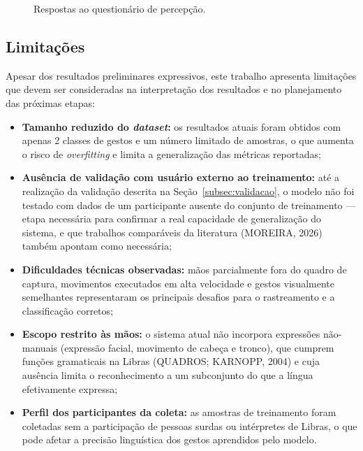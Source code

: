 \begin{figure}[htbp]
\centering
{}
\caption{Respostas ao questionário de percepção.}
\label{fig:questionario}
\end{figure}

\subsection{Limitações}
\label{subsec:limitacoes}

Apesar dos resultados preliminares expressivos, este trabalho apresenta
limitações que devem ser consideradas na interpretação dos resultados e no
planejamento das próximas etapas:

\begin{itemize}[leftmargin=2cm]
  \item \textbf{Tamanho reduzido do \textit{dataset}:} os resultados atuais foram
  obtidos com apenas 2 classes de gestos e um número limitado de amostras, o que
  aumenta o risco de \textit{overfitting} e limita a generalização das métricas
  reportadas;
  \item \textbf{Ausência de validação com usuário externo ao treinamento:} até a
  realização da validação descrita na Seção~\ref{subsec:validacao}, o modelo não
  foi testado com dados de um participante ausente do conjunto de treinamento —
  etapa necessária para confirmar a real capacidade de generalização do sistema,
  e que trabalhos comparáveis da literatura (MOREIRA, 2026) também apontam como
  necessária;
  \item \textbf{Dificuldades técnicas observadas:} mãos parcialmente fora do
  quadro de captura, movimentos executados em alta velocidade e gestos
  visualmente semelhantes representaram os principais desafios para o
  rastreamento e a classificação corretos;
  \item \textbf{Escopo restrito às mãos:} o sistema atual não incorpora
  expressões não-manuais (expressão facial, movimento de cabeça e tronco), que
  cumprem funções gramaticais na Libras (QUADROS; KARNOPP, 2004) e cuja ausência
  limita o reconhecimento a um subconjunto do que a língua efetivamente expressa;
  \item \textbf{Perfil dos participantes da coleta:} as amostras de treinamento
  foram coletadas sem a participação de pessoas surdas ou intérpretes de Libras, o
  que pode afetar a precisão linguística dos gestos aprendidos pelo modelo.
\end{itemize}

